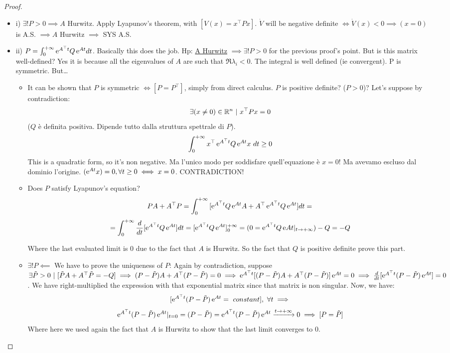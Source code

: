 \begin{proof}
\begin{itemize}
\item{i)} $\exists! P>0 \implies A$ Hurwitz. Apply Lyapunov's theorem, with $[V(x) = x^\top Px]$. $\dot{V}$ will be negative definite $\iff \dot{V}(x) < 0 \implies (x=0)$ is A.S. $\implies A$ Hurwitz $\implies$ SYS A.S.
\item{ii)} $P = \int_0^{+\infty}{\mathop{}\!\mathrm{e}^{A^\top t}Q\mathop{}\!\mathrm{e}^{At}dt}$. Basically this does the job. Hp: \underline{A Hurwitz} $\implies \exists! P > 0$ for the previous proof's point. But is this matrix well-defined? Yes it is because all the eigenvalues of $A$ are such that $\Re{\lambda_i} < 0$. The integral is well defined (ie convergent). P is symmetric. But\dots
\begin{itemize}
\item It can be shown that $P$ is symmetric $\iff [P=P^\top]$, simply from direct calculus. $P$ is positive definite? ($P > 0$)?
Let's suppose by contradiction:
\[
	\exists (x \neq 0) \in \mathbb{R}^n\ |\ x^\top Px = 0
\]
($Q$ è definita positiva. Dipende tutto dalla struttura spettrale di $P$).
\[	
	\int_0^{+\infty}{x^\top \mathop{}\!\mathrm{e}^{A^\top t}Q\mathop{}\!\mathrm{e}^{At}x\ dt} \geq 0
\]
This is a quadratic form, so it's non negative. Ma l'unico modo per soddisfare quell'equazione è $x=0$! Ma avevamo escluso dal dominio l'origine. $(\mathop{}\!\mathrm{e}^{At}x) = 0, \forall t \geq 0 \iff x=0$. CONTRADICTION! \QEDA

\item Does $P$ satisfy Lyapunov's equation?
\[
	PA+ A^\top P = \int_0^{+\infty}{[\mathop{}\!\mathrm{e}^{A^\top t}Q\mathop{}\!\mathrm{e}^{At}A + A^\top \mathop{}\!\mathrm{e}^{A^\top t}Q\mathop{}\!\mathrm{e}^{At}]dt} =
\]
\[
	= \int_0^{+\infty}{\frac{d}{dt}[\mathop{}\!\mathrm{e}^{A^\top t}Q\mathop{}\!\mathrm{e}^{At}]dt} = [\mathop{}\!\mathrm{e}^{A^\top t}Q\mathop{}\!\mathrm{e}^{At}]_{0}^{+\infty} = (0 = \mathop{}\!\mathrm{e}^{A^\top t}Q\mathop{}\!\mathrm{e}{At}|_{t\to +\infty}) - Q = -Q
\]

Where the last evaluated limit is 0 due to the fact that $A$ is Hurwitz. So the fact that $Q$ is positive definite prove this part. \QEDA

\item $\exists!P \impliedby$ We have to prove the uniqueness of $P$:
Again by contradiction, suppose $\exists \tilde{P} > 0\ |\ [\tilde{P}A + A^\top \tilde{P} = -Q] \implies (P-\tilde{P})A + A^\top (P-\tilde{P}) = 0 \implies \mathop{}\!\mathrm{e}^{A^\top t}[(P-\tilde{P})A + A^\top (P-\tilde{P})]\mathop{}\!\mathrm{e}^{At} = 0 \implies \frac{d}{dt}[\mathop{}\!\mathrm{e}^{A^\top t}(P-\tilde{P})\mathop{}\!\mathrm{e}^{At}] = 0$. We have right-multiplied the expression with that exponential matrix since that matrix is non singular. Now, we have:
\[
	[\e^{A^\top t}(P-\tilde{P})\e^{At} =\ constant],\ \forall t \implies
\]
\[
	\e^{A^\top t}(P-\tilde{P})\e^{At}|_{t=0} = (P-\tilde{P}) = \e^{A^\top t}(P-\tilde{P})\e^{At} \tendsto{t\to +\infty} 0 \implies [P=\tilde{P}]
\]
Where here we used again the fact that $A$ is Hurwitz to show that the last limit converges to 0. \QEDA
\end{itemize}
\end{itemize}
\end{proof}

